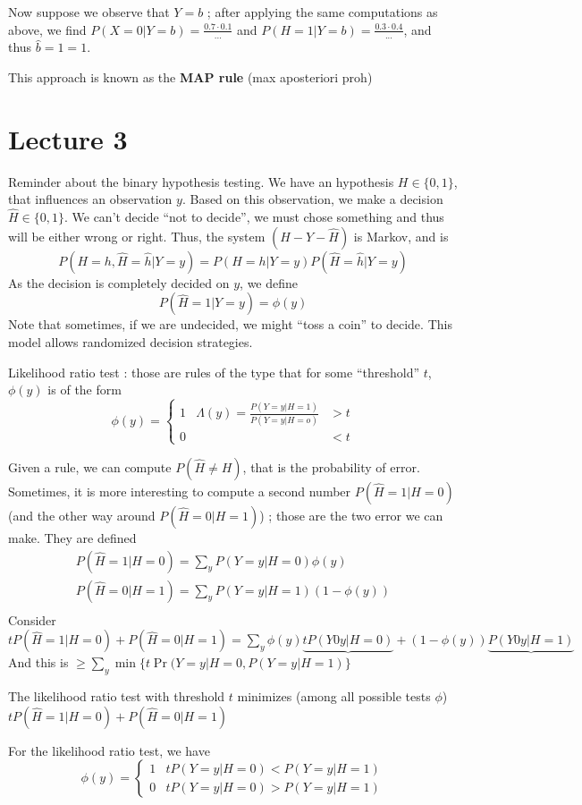 \documentclass[11pt,a4paper]{article}
\begin{document}
Now suppose we observe that $Y=b$ ; after applying the same computations as above, we find $P(X=0 | Y=b) = \frac{0.7\cdot0.1}{...}$ and $P(H=1 | Y=b) = \frac{0.3\cdot0.4}{...}$, and thus $\hat{b}=1 = 1$.

\begin{definition}
    This approach is known as the \textbf{MAP rule} (max aposteriori proh)
\end{definition}
\section{Lecture 3}
Reminder about the binary hypothesis testing. We have an hypothesis $H \in \{0,1\}$, that influences an observation $y$. Based on this observation, we make a decision $\hat{H} \in \{0,1\}$. We can't decide ``not to decide'', we must chose something and thus will be either wrong or right. Thus, the system $(H - Y - \hat{H})$ is Markov, and is 
\[P(H=h, \hat{H} = \hat{h} | Y=y) = P(H=h|Y=y) P(\hat{H} = \hat{h} | Y=y)\]
As the decision is completely decided on $y$, we define 
\[P(\hat{H} = 1 | Y=y) = \phi(y)\]
Note that sometimes, if we are undecided, we might ``toss a coin'' to decide. This model allows randomized decision strategies. 

Likelihood ratio test :  those are rules of the type that for some ``threshold'' $t$, $\phi(y)$ is of the form 
\[\phi(y) =  \left\{\begin{array}{lll}
    1 & \Lambda(y) = \frac{P(Y=y|H=1)}{P(Y=y|H=o)} & > t\\
    0 & & < t
\end{array}\right.\]

Given a rule, we can compute $P(\hat{H} \neq H)$, that is the probability of error. Sometimes, it is more interesting to compute a second number $P(\hat{H} = 1 | H=0)$ (and the other way around $P(\hat{H} = 0 | H=1)$) ; those are the two error we can make. They are defined 
\begin{align}
    P(\hat{H} = 1 | H=0) = \sum_y P(Y=y | H=0) \phi(y)\\
    P(\hat{H} = 0 | H=1) = \sum_y P(Y=y | H=1) (1-\phi(y))\\
\end{align}
Consider $tP(\hat{H} = 1 | H=0) + P(\hat{H} = 0 | H=1) = \sum_y \phi(y)\underbrace{tP(Y0y|H=0)} + (1-\phi(y))\underbrace{P(Y0y|H=1)}$ And this is $\geq \sum_y \min\{t\Pr(Y=y|H=0, P(Y=y|H=1)\}$

\begin{boite}
     The likelihood ratio test with threshold $t$ minimizes (among all possible tests $\phi$) $tP(\hat{H} = 1 | H=0) + P(\hat{H}=0|H=1)$
\end{boite}
For the likelihood ratio test, we have 
\[\phi(y) = \left\{\begin{array}{ll}
    1 & tP(Y=y| H=0)  < P(Y=y|H=1)\\
    0  & tP(Y=y| H=0)  > P(Y=y|H=1)
\end{array}\right.\]
\end{document}
